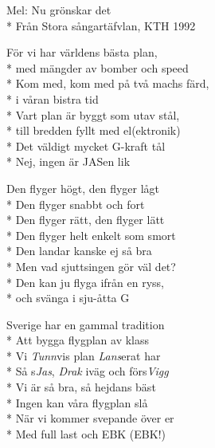 \begin{SongText}
    \begin{SongInfo}
        Mel: Nu grönskar det\\*%
        Från Stora sångartäfvlan, KTH 1992
    \end{SongInfo}
    \begin{SongVerse}
        För vi har världens bästa plan,\\*%
        med mängder av bomber och speed\\*%
        Kom med, kom med på två machs färd,\\*%
        i våran bistra tid\\*%
        Vart plan är byggt som utav stål,\\*%
        till bredden fyllt med el(ektronik)\\*%
        Det väldigt mycket G-kraft tål\\*%
        Nej, ingen är JASen lik
    \end{SongVerse}
    \begin{SongVerse}
        Den flyger högt, den flyger lågt\\*%
        Den flyger snabbt och fort\\*%
        Den flyger rätt, den flyger lätt\\*%
        Den flyger helt enkelt som smort\\*%
        Den landar kanske ej så bra\\*%
        Men vad sjuttsingen gör väl det?\\*%
        Den kan ju flyga ifrån en ryss,\\*%
        och svänga i sju-åtta G
    \end{SongVerse}
    \begin{SongVerse}
        Sverige har en gammal tradition\\*%
        Att bygga flygplan av klass\\*%
        Vi \textit{Tunn}vis plan \textit{Lans}erat har\\*%
        Så s\textit{Jas}, \textit{Drak} iväg och förs\textit{Vigg}\\*%
        Vi är så bra, så hejdans bäst\\*%
        Ingen kan våra flygplan slå\\*%
        När vi kommer svepande över er\\*%
        Med full last och EBK (EBK!)
    \end{SongVerse}
\end{SongText}

